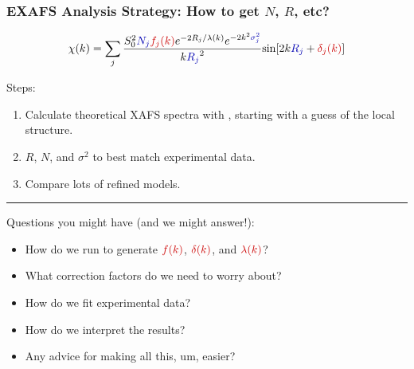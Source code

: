 \begin{frame}  \frametitle{EXAFS Analysis Strategy:  How to get $N$, $R$, etc?}

  \begin{cenpage}{99mm}

      \[
      \chi(k) = \sum_j {{ S_0^2 {\Blue{N_j}} {\Red{f_j(k)}}  e^{-2R_j/\lambda(k)}
          e^{-2k^2{\Blue{\sigma_j^2}}}}\over{k{\Blue{R_j}}^2}}
      {\sin[{2k{\Blue{R_j}} + {\Red{\delta_j(k)}}} ]}
      \]

   \vmm
   Steps:
   \begin{enumerate}
   \item Calculate theoretical XAFS spectra  with {\feff},  starting with a guess of the local structure.
   \item  {} $R$, $N$, and $\sigma^2$  to best match  experimental data.
   \item Compare lots of refined models.
   \end{enumerate}

\vmm \vmm \hrule \vmm\vmm

 Questions you might have (and we might answer!):

  \begin{itemize}
  \item How do we run {\feff} to generate $\Red{f(k)}$, $\Red{\delta(k)}$,
    and  $\Red{\lambda(k)}$?
  \item What correction factors do we need to worry about?
  \item How do we fit experimental data?
  \item How do we interpret the results?
  \item Any advice for making all this, um, easier?
  \end{itemize}

\vfill
   \end{cenpage}

\end{frame}




